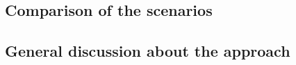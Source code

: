 \subsection{Comparison of the scenarios}
\label{subsec:Comparison fo the scenarios}

\subsection{General discussion about the approach}
\label{subsec:General discussion about the approach}

%
